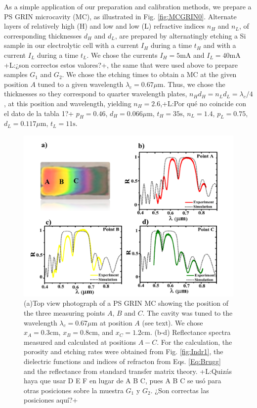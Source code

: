 \documentclass{article}
\newcommand{\notaL}[1]{{\color{blue}+L:#1+}}
\begin{document}
As a simple application of our preparation and calibration methods, we
prepare a PS GRIN microcavity (MC), as illustrated in
Fig. \ref{fig:MCGRIN0}.  Alternate layers of relatively high (H) and low and low
(L) refractive indices $n_H$ and $n_L$, of corresponding thicknesses
$d_H$ and $d_L$, are prepared by alternatingly etching a Si sample in our
electrolytic cell with a current $I_H$ during a time $t_H$ and with a
current $I_L$ during a time $t_L$. We chose the currents $I_H=5\text{mA}$
and $I_L=40\text{mA}$ \notaL{¿son correctos estos valores?}, the same
that were used above to prepare samples $G_1$ and $G_2$.
We chose the etching times to obtain a MC at the given
position $A$ tuned to a given wavelength
$\lambda_c=0.67\mu\text{m}$. Thus, we chose the thicknesses so they
correspond to quarter wavelength plates, $n_Hd_H=n_Ld_L=\lambda_c/4$,
at this position and wavelength, yielding $n_H =2.6$,\notaL{Por qué no
  coincide con el dato de la tabla 1?} $p_H =0.46$,
$d_H=0.066\mu\text{m}$, $t_H=35\text{s}$, $n_L= 1.4$, $p_L =0.75$,
$d_L=0.117\mu\text{m}$, $t_L=11\text{s}$.
\begin{figure}
  \centering
  \includegraphics[width=\textwidth]{Images/MCGRIN2}
  \caption{(a)Top view photograph of a PS GRIN MC showing the position
    of the three measuring points $A$, $B$ and $C$. The cavity was
    tuned to the wavelength $\lambda_c=0.67\mu\text{m}$ at position
    $A$ (see text). We chose $x_A=0.3\text{cm}$, $x_B=0.8\text{cm}$,
    and $x_C=1.2\text{cm}$. (b-d) Reflectance spectra measured and
    calculated at positions $A-C$. For the calculation, the porosity
    and etching rates were obtained from Fig. \ref{fig:Indr1},
    the dielectric functions and indices of refracton from
    Eqs. \eqref{Eq:Brugg} and the reflectance from standard transfer
    matrix theory. \notaL{Quizás haya que usar D E F en lugar de A B
      C, pues A B C se usó para otras posiciones sobre la muestra
      $G_1$ y $G_2$. ¿Son correctas las posiciones aquí?}}
  \label{fig:MCGRIN3}
\end{figure}
\end{document}

